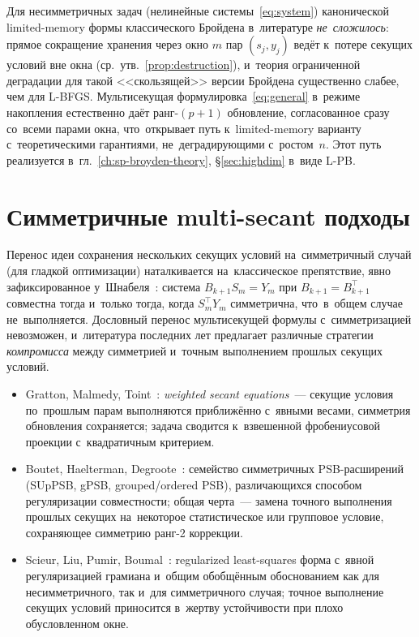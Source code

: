 Для несимметричных задач (нелинейные системы~\eqref{eq:system})
канонической limited-memory формы классического Бройдена в~литературе
\emph{не~сложилось}: прямое сокращение хранения через окно $m$ пар
$(s_j, y_j)$ ведёт к~потере секущих условий вне окна (ср.\
утв.~\ref{prop:destruction}), и~теория ограниченной деградации
для такой <<скользящей>> версии Бройдена существенно слабее, чем
для L-BFGS. Мультисекущая формулировка~\eqref{eq:general} в~режиме
накопления естественно даёт ранг-$(p{+}1)$ обновление, согласованное
сразу со~всеми парами окна, что~открывает путь к~limited-memory
варианту с~теоретическими гарантиями, не~деградирующими с~ростом~$n$.
Этот путь реализуется в~гл.~\ref{ch:sp-broyden-theory},
\S\ref{sec:highdim} в~виде L-PB.


\section{Симметричные multi-secant подходы}\label{sec:ch1_sym}

Перенос идеи сохранения нескольких секущих условий на~симметричный
случай (для гладкой оптимизации) наталкивается на~классическое
препятствие, явно зафиксированное у~Шнабеля~\cite{schnabel1983}:
система $B_{k+1} S_m = Y_m$ при $B_{k+1} = B_{k+1}^\top$ совместна
тогда и~только тогда, когда $S_m^\top Y_m$ симметрична, что~в~общем
случае не~выполняется. Дословный перенос мультисекущей формулы
с~симметризацией невозможен, и~литература последних лет предлагает
различные стратегии \emph{компромисса} между симметрией и~точным
выполнением прошлых секущих условий.

\begin{itemize}[leftmargin=*]
  \item Gratton, Malmedy, Toint~\cite{gratton2015}: \emph{weighted
        secant equations}~--- секущие условия по~прошлым парам
        выполняются приближённо с~явными весами, симметрия
        обновления сохраняется; задача сводится к~взвешенной
        фробениусовой проекции с~квадратичным критерием.
  \item Boutet, Haelterman, Degroote~\cite{boutet2020,boutet2021,boutet2022}:
        семейство симметричных PSB-расширений (SUpPSB, gPSB,
        grouped/ordered PSB), различающихся способом
        регуляризации совместности; общая черта~--- замена
        точного выполнения прошлых секущих на~некоторое
        статистическое или групповое условие, сохраняющее
        симметрию ранг-2 коррекции.
  \item Scieur, Liu, Pumir, Boumal~\cite{scieur2021}: regularized
        least-squares форма с~явной регуляризацией грамиана и~общим
        обобщённым обоснованием как для несимметричного, так и~для
        симметричного случая; точное выполнение секущих условий
        приносится в~жертву устойчивости при плохо обусловленном
        окне.
\end{itemize}

